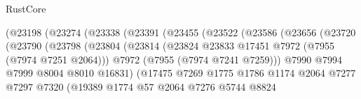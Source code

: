 \begin{lexlean}{RustCore}
\begin{coremodule}
                                  (@23198
                                    (@23274
                                      (@23338
                                        (@23391
                                          (@23455
                                            (@23522
                                              (@23586
                                                (@23656
                                                  (@23720
                                                    (@23790
                                                      (@23798
                                                        (@23804
                                                          (@23814
                                                            (@23824
                                                              @23833
                                                              @17451
                                                              @7972
                                                              (@7955 (@7974 @7251 @2064)))
                                                            @7972
                                                            (@7955 (@7974 @7241 @7259)))
                                                          @7990
                                                          @7994
                                                          @7999
                                                          @8004
                                                          @8010
                                                          @16831)
                                                        (@17475
                                                          @7269
                                                          @1775
                                                          @1786
                                                          @1174
                                                          @2064
                                                          @7277
                                                          @7297
                                                          @7320
                                                          (@19389
                                                            @1774
                                                            @57
                                                            @2064
                                                            @7276
                                                            @5744
                                                            @8824

\end{coremodule}
\end{lexlean}
